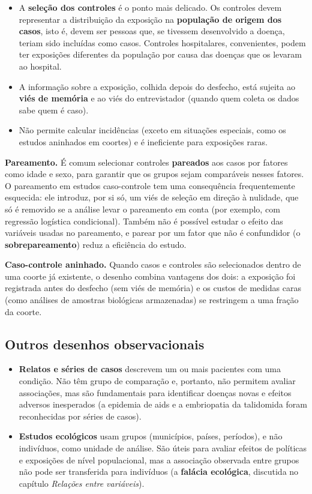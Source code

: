 \documentclass[
]{book}
\providecommand{\tightlist}{%
  \setlength{\itemsep}{0pt}\setlength{\parskip}{0pt}}
\begin{document}
\begin{itemize}
\tightlist
\item
  A \textbf{seleção dos controles} é o ponto mais delicado. Os controles devem representar a distribuição da exposição na \textbf{população de origem dos casos}, isto é, devem ser pessoas que, se tivessem desenvolvido a doença, teriam sido incluídas como casos. Controles hospitalares, convenientes, podem ter exposições diferentes da população por causa das doenças que os levaram ao hospital.
\item
  A informação sobre a exposição, colhida depois do desfecho, está sujeita ao \textbf{viés de memória} e ao viés do entrevistador (quando quem coleta os dados sabe quem é caso).
\item
  Não permite calcular incidências (exceto em situações especiais, como os estudos aninhados em coortes) e é ineficiente para exposições raras.
\end{itemize}

\textbf{Pareamento.} É comum selecionar controles \textbf{pareados} aos casos por fatores como idade e sexo, para garantir que os grupos sejam comparáveis nesses fatores. O pareamento em estudos caso-controle tem uma consequência frequentemente esquecida: ele introduz, por si só, um viés de seleção em direção à nulidade, que só é removido se a análise levar o pareamento em conta (por exemplo, com regressão logística condicional). Também não é possível estudar o efeito das variáveis usadas no pareamento, e parear por um fator que não é confundidor (o \textbf{sobrepareamento}) reduz a eficiência do estudo.

\textbf{Caso-controle aninhado.} Quando casos e controles são selecionados dentro de uma coorte já existente, o desenho combina vantagens dos dois: a exposição foi registrada antes do desfecho (sem viés de memória) e os custos de medidas caras (como análises de amostras biológicas armazenadas) se restringem a uma fração da coorte.

\subsection{Outros desenhos observacionais}\label{outros-desenhos-observacionais}

\begin{itemize}
\tightlist
\item
  \textbf{Relatos e séries de casos} descrevem um ou mais pacientes com uma condição. Não têm grupo de comparação e, portanto, não permitem avaliar associações, mas são fundamentais para identificar doenças novas e efeitos adversos inesperados (a epidemia de aids e a embriopatia da talidomida foram reconhecidas por séries de casos).
\item
  \textbf{Estudos ecológicos} usam grupos (municípios, países, períodos), e não indivíduos, como unidade de análise. São úteis para avaliar efeitos de políticas e exposições de nível populacional, mas a associação observada entre grupos não pode ser transferida para indivíduos (a \textbf{falácia ecológica}, discutida no capítulo \emph{Relações entre variáveis}).
\end{itemize}
\end{document}
